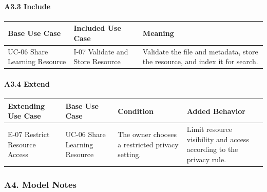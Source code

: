 \documentclass[12pt]{article}
\renewcommand{\baselinestretch}{1.5}
\begin{document}
\hypertarget{sec:a3-3-include}{}
\paragraph*{A3.3 Include}
\par\medskip

\begingroup
\small
\renewcommand{\baselinestretch}{1.0}\selectfont
\renewcommand{\arraystretch}{1.15}
\setlength{\tabcolsep}{6pt}
\begin{longtable}{|>{\raggedright\arraybackslash}p{}|>{\raggedright\arraybackslash}p{}|>{\raggedright\arraybackslash}p{}|}
\hline
\textbf{Base Use Case} & \textbf{Included Use Case} & \textbf{Meaning} \\ \hline
\endhead
UC-06 Share Learning Resource & I-07 Validate and Store Resource & Validate the file and metadata, store the resource, and index it for search. \\ \hline
\end{longtable}
\endgroup
\par\medskip

\hypertarget{sec:a3-4-extend}{}
\paragraph*{A3.4 Extend}
\par\medskip

\begingroup
\small
\renewcommand{\baselinestretch}{1.0}\selectfont
\renewcommand{\arraystretch}{1.15}
\setlength{\tabcolsep}{6pt}
\begin{longtable}{|>{\raggedright\arraybackslash}p{}|>{\raggedright\arraybackslash}p{}|>{\raggedright\arraybackslash}p{}|>{\raggedright\arraybackslash}p{}|}
\hline
\textbf{Extending Use Case} & \textbf{Base Use Case} & \textbf{Condition} & \textbf{Added Behavior} \\ \hline
\endhead
E-07 Restrict Resource Access & UC-06 Share Learning Resource & The owner chooses a restricted privacy setting. & Limit resource visibility and access according to the privacy rule. \\ \hline
\end{longtable}
\endgroup
\par\medskip

\hypertarget{sec:a4-model-notes}{}
\subsubsection*{A4. Model Notes}
\par\medskip
\end{document}
